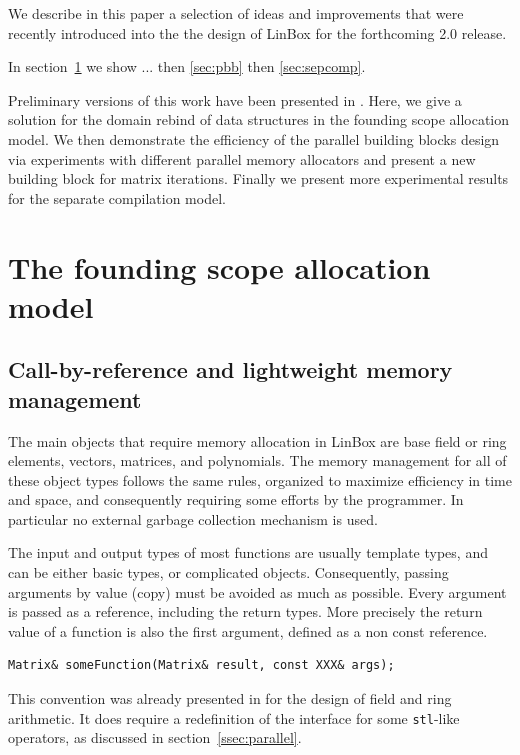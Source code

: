 \documentclass{article}
\newcommand{\linbox}{{\sc LinBox}\xspace}
\begin{document}
We describe in this paper a selection of ideas and
improvements that were recently introduced into the the design of \linbox
for the forthcoming 2.0 release.


In section~\ref{sec:mem} we show ...
then \ref{sec:pbb}
then \ref{sec:sepcomp}.




Preliminary versions of this work have been presented in
\cite{jgd:2010:icmslinbox}. Here, we give a solution for the domain rebind
of data structures in the founding scope allocation model.
We then demonstrate the efficiency of the parallel building blocks
design via experiments with different parallel memory allocators and
present a new building block for matrix iterations.
Finally we present more experimental results for the separate
compilation model.


\section{The founding scope allocation model}\label{sec:mem}
\subsection{Call-by-reference and lightweight memory management}

The main objects that require memory allocation in \linbox are base field or
ring elements, vectors, matrices, and polynomials.
The memory management for all of these object types follows the same rules, organized to
maximize efficiency in time and space, and consequently requiring some
efforts by  the programmer. In particular no external garbage collection
mechanism is used.

The input and output types of most functions are usually template
types, and can be either basic types, or complicated
objects. Consequently, passing arguments by value (copy) must be avoided as
much as possible. Every argument is passed as a reference, including
the return types. More precisely the return value of a function is
also the first argument, defined as a non const reference. 
\begin{verbatim}
Matrix& someFunction(Matrix& result, const XXX& args);
\end{verbatim}
This convention was already presented in \cite[\S 2.1]{jgd:2002:icms} for the
design of field and ring arithmetic. It does require a redefinition of the interface
for some \texttt{stl}-like operators, as discussed in
section~\ref{ssec:parallel}.
\end{document}
